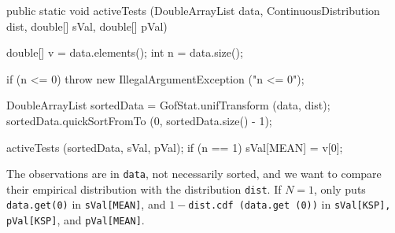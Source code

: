 \begin{htmlonly}
\end{htmlonly}
\begin{code}

   public static void activeTests (DoubleArrayList data,
                                   ContinuousDistribution dist,
                                   double[] sVal, double[] pVal)\begin{hide} {
      double[] v = data.elements();
      int n = data.size();

      if (n <= 0)
        throw new IllegalArgumentException ("n <= 0");

      DoubleArrayList sortedData = GofStat.unifTransform (data, dist);
      sortedData.quickSortFromTo (0, sortedData.size() - 1);

      activeTests (sortedData, sVal, pVal);
      if (n == 1)
         sVal[MEAN] = v[0];
   }\end{hide}
\end{code}
\begin{tabb} The observations are in \texttt{data},
 not necessarily sorted, and we want to compare their empirical
 distribution with the distribution \texttt{dist}.
 If $N = 1$, only puts \texttt{data.get(0)} in \texttt{sVal[MEAN]},
 and $1 - {}$\texttt{dist.cdf (data.get (0))} in \texttt{sVal[KSP], pVal[KSP]},
 and \texttt{pVal[MEAN]}.
 \end{tabb}
\begin{htmlonly}
\end{htmlonly}
